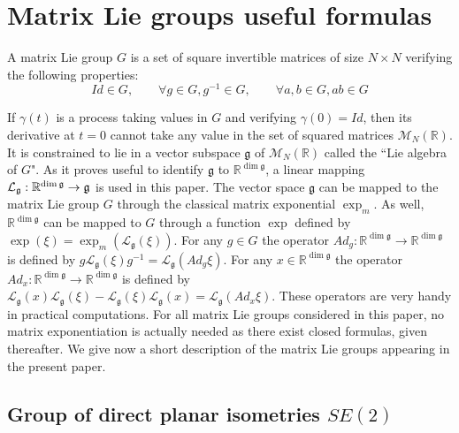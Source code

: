 \documentclass[a4paper,12pt,onecolumn]{article}
\newcommand{\RR}{{\mathbb{R}}}
\begin{document}
\appendix


 \section{Matrix Lie groups useful formulas}
\label{sect::tuto_Lie_groups}

A matrix Lie group $G$ is a set of square invertible matrices of size $N \times N$ verifying the following properties:
\[
Id \in G, \qquad \forall g \in G, g^{-1} \in G , \qquad \forall a,b \in G, ab \in G
\]

If $\gamma(t)$ is a process taking values in $G$ and verifying $\gamma(0)=Id$, then its derivative at $t=0$ cannot take any value in the set of squared matrices $\mathcal{M}_N(\RR)$. It is constrained to lie in a vector subspace $\mathfrak{g}$ of $\mathcal{M}_N( \RR )$ called the ``Lie algebra of $G$". As it proves useful to identify $\mathfrak{g}$ to $\RR^{\dim \mathfrak{g}}$, a linear mapping $\mathcal{L}_{\frak{g}}: \RR^{\dim \frak{g}} \rightarrow \frak{g}$ is used in this paper. The vector space $\mathfrak{g}$ can be mapped to the matrix Lie group $G$ through the classical matrix exponential $\exp_m$. As well, $\RR^{\dim \mathfrak{g}}$ can be mapped to $G$ through a function $\exp$ defined by $\exp(\xi)=\exp_m(\mathcal{L}_{\mathfrak{g}}(\xi))$. For any $g\in G$ the operator $Ad_g : \RR^{\dim \mathfrak{g}} \rightarrow  \RR^{\dim \mathfrak{g}}$ is defined by $g \mathcal{L}_{\mathfrak{g}}(\xi) g^{-1} = \mathcal{L}_{\mathfrak{g}}(Ad_g \xi)$. For any $x \in \RR^{\dim \mathfrak{g}}$ the operator $Ad_{x} : \RR^{\dim \mathfrak{g}} \rightarrow  \RR^{\dim \mathfrak{g}}$ is defined by $\mathcal{L}_{\mathfrak{g}}(x) \mathcal{L}_{\mathfrak{g}}(\xi) - \mathcal{L}_{\mathfrak{g}}(\xi) \mathcal{L}_{\mathfrak{g}}(x) = \mathcal{L}_{\mathfrak{g}}(Ad_x \xi)$. These operators are very handy in practical computations. For all matrix Lie groups considered in this paper, no matrix exponentiation is actually needed as there exist closed formulas, given thereafter. We give now a short description of the matrix Lie groups appearing in the present paper.

\subsection{Group of direct planar isometries $SE(2)$}
\label{sect::tuto_SE2}
\end{document}
